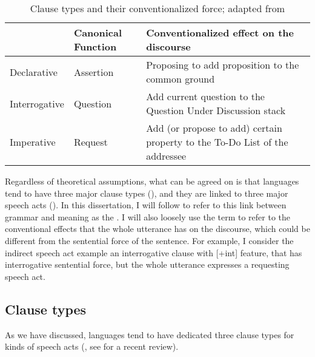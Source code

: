 \begin{table}[H]
\begin{center}
\begin{tabular}{l|l|p{8cm}} 
\hline 
& Canonical Function & Conventionalized effect on the discourse \\
\hline
Declarative & Assertion & Proposing to add proposition to the common ground \\ 
\hline
Interrogative & Question & Add current question to the Question Under Discussion stack \\
\hline
Imperative & Request & Add (or propose to add) certain property to the To-Do List of the addressee \\ 
\hline
\end{tabular} 
\end{center}
\caption{Clause types and their conventionalized force; adapted from \textcite[p.238]{portner2004}}
\label{tab:intro:portner2004}
\end{table}



Regardless of theoretical assumptions, what can be agreed on is that languages tend to have three major clause types (\diis{}), and they are linked to three major speech acts (\aqrs{}). In this dissertation, I will follow \textcite{chierchia1990textbook} to refer to this link between grammar and meaning as the . I will also loosely use the term  to refer to the conventional effects that the whole utterance has on the discourse, which could be different from the sentential force of the sentence. For example, I consider the indirect speech act example  an interrogative clause with [+int] feature, that has interrogative sentential force, but the whole utterance expresses a requesting speech act. 




\subsection{Clause types}
\label{sec:bg:theory:clause}

As we have discussed, languages tend to have dedicated three clause types for kinds of speech acts (\citealt{sz1985speechact, konig2007, aikhenvald2016, portner2018}, see \cite{konig2020} for a recent review).

